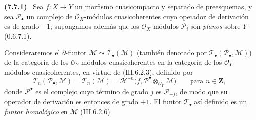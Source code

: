 \documentclass[10pt,oneside]{book}
\newcommand{\sref}[2][]{\textup{(#2)}}
\newcommand{\oldpage}[2][]{\setcounter{footnote}{0}\marginpar{\scriptsize\textbf{#1}~|~#2}\ignorespaces}
\newenvironment{env}[1][]{\par\medskip\noindent\textbf{(#1)}\ }{\par}
\begin{document}
\begin{env}[7.7.1]
\label{III.7.7.1}
Sea $f:X\to Y$ un morfismo cuasicompacto y separado de preesquemas, y sea
$\mathscr P_\bullet$ un complejo de $\mathscr O_X$-módulos cuasicoherentes cuyo
operador de derivación es de grado $-1$; supongamos además que los
$\mathscr O_X$-módulos $\mathscr P_i$ son \emph{planos} sobre $Y$
\sref[0]{0.6.7.1}.

\oldpage[III]{198}
Consideraremos el $\partial$-funtor
$\mathscr M\leadsto\mathscr T_\bullet(\mathscr M)$ (también denotado por
$\mathscr T_\bullet(\mathscr P_\bullet,\mathscr M)$) de la categoría de los
$\mathscr O_Y$-módulos cuasicoherentes en la categoría de los
$\mathscr O_Y$-módulos cuasicoherentes, en virtud de \sref{III.6.2.3}, definido
por
\[
  \mathscr T_n(\mathscr P_\bullet,\mathscr M)
  =\mathscr T_n(\mathscr M)
  =\mathscr H^{-n}
    \bigl(f,\mathscr P^\bullet\otimes_{\mathscr O_Y}\mathscr M\bigr)
  \qquad\text{para }n\in\mathbf Z,
  \tag{7.7.1.1}\label{III.7.7.1.1}
\]
donde $\mathscr P^\bullet$ es el complejo cuyo término de grado $j$ es
$\mathscr P_{-j}$, de modo que su operador de derivación es entonces de grado
$+1$. El funtor $\mathscr T_\bullet$ así definido es un \emph{funtor
homológico} en $\mathscr M$ \sref{III.6.2.6}.
\end{env}
\end{document}
